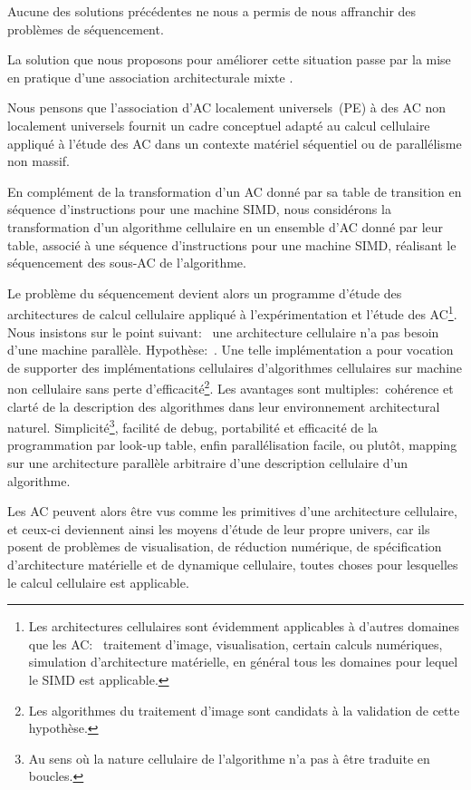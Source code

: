 Aucune des solutions précédentes ne nous a permis de nous affranchir
des problèmes de séquencement. %

La solution que nous proposons pour améliorer cette situation passe
par la mise en pratique d'une association architecturale mixte
. %

Nous pensons que l'association d'AC localement universels~(PE) à des
AC non localement universels fournit un cadre conceptuel adapté au
calcul cellulaire appliqué à l'étude des AC dans un contexte matériel
séquentiel ou de parallélisme non massif. %

En complément de la transformation d'un AC donné par sa table de
transition en séquence d'instructions pour une machine SIMD, nous
considérons la transformation d'un algorithme cellulaire en un
ensemble d'AC donné par leur table, associé à une séquence
d'instructions pour une machine SIMD, réalisant le séquencement des
sous-AC de l'algorithme.

Le problème du séquencement devient alors un programme d'étude des
architectures de calcul cellulaire appliqué à l'expérimentation et
l'étude des AC\footnote{%
  Les architectures cellulaires sont évidemment applicables à d'autres
  domaines que les AC:~%
  traitement d'image, visualisation, certain calculs numériques,
  simulation d'architecture matérielle, en général tous les domaines
  pour lequel le SIMD est applicable.}. %
Nous insistons sur le point suivant:~%
une architecture cellulaire n'a pas besoin d'une machine parallèle.
Hypothèse:~. %
Une telle implémentation a pour vocation de supporter des
implémentations cellulaires d'algorithmes cellulaires sur machine non
cellulaire sans perte d'efficacité\footnote{%
  Les algorithmes du traitement d'image sont candidats à la validation
  de cette hypothèse.}. %
Les avantages sont multiples:~cohérence et clarté de la description
des algorithmes dans leur environnement architectural naturel. %
Simplicité\footnote{%
  Au sens où la nature cellulaire de l'algorithme n'a pas à être
  traduite en boucles.}, %
facilité de debug,
portabilité et efficacité de la programmation par look-up table, %
enfin parallélisation facile, ou plutôt, mapping sur une architecture
parallèle arbitraire d'une description cellulaire d'un algorithme.

Les AC peuvent alors être vus comme les primitives d'une
architecture cellulaire, et ceux-ci deviennent ainsi les moyens
d'étude de leur propre univers, car ils posent de problèmes de
visualisation, de réduction numérique, de spécification d'architecture
matérielle et de dynamique cellulaire, toutes choses pour lesquelles
le calcul cellulaire est applicable.

